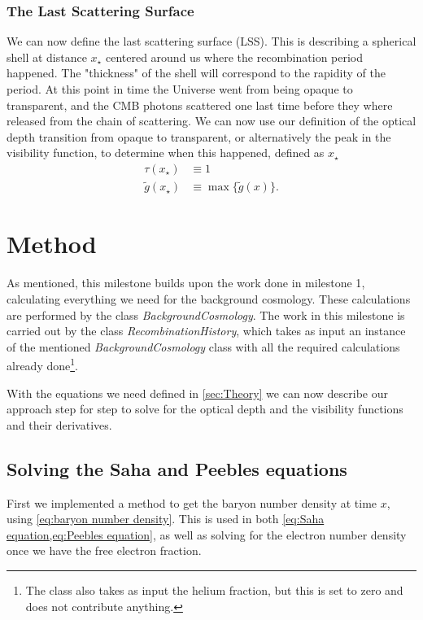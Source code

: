 \documentclass[10pt,a4paper]{article}
\begin{document}
\subsubsection{The Last Scattering Surface}
\label{subsubsec:Theory/last scattering surface}
We can now define the last scattering surface (LSS). This is describing a spherical shell at distance $x_\star$ centered around us where the recombination period happened. The "thickness" of the shell will correspond to the rapidity of the period. At this point in time the Universe went from being opaque to transparent, and the CMB photons scattered one last time before they where released from the chain of scattering. We can now use our definition of the optical depth transition from opaque to transparent, or alternatively the peak in the visibility function, to determine when this happened, defined as $x_\star$
\begin{align*}
    \tau(x_\star) &\equiv 1 \label{eq:tau equiv 1}
    \\
    \tilde{g}(x_\star) &\equiv \max \{\tilde{g}(x)\}.
\end{align*}

\section{Method}
\label{sec:Method}
As mentioned, this milestone builds upon the work done in milestone 1\citep{milestone1}, calculating everything we need for the background cosmology. These calculations are performed by the class \textit{BackgroundCosmology}. The work in this milestone is carried out by the class \textit{RecombinationHistory}, which takes as input an instance of the mentioned \textit{BackgroundCosmology} class with all the required calculations already done\footnote{The class also takes as input the helium fraction, but this is set to zero and does not contribute anything.}.

With the equations we need defined in \cref{sec:Theory} we can now describe our approach step for step to solve for the optical depth and the visibility functions and their derivatives.

\subsection{Solving the Saha and Peebles equations}
\label{subsec:Method/Solving Xe}
First we implemented a method to get the baryon number density at time $x$, using \cref{eq:baryon number density}. This is used in both \cref{eq:Saha equation,eq:Peebles equation}, as well as solving for the electron number density once we have the free electron fraction.
\end{document}

